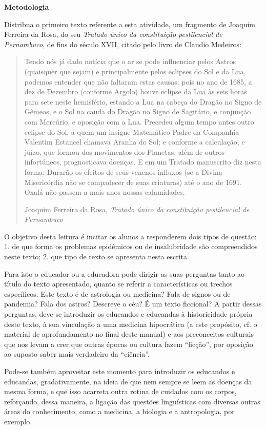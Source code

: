 \documentclass[12pt]{extarticle}
\begin{document}
\textbf{Metodologia}

Distribua o primeiro texto referente a esta atividade, um fragmento de
Joaquim Ferreira da Rosa, do seu \emph{Tratado único da constituição
pestilencial de Pernambuco}, de fins do século XVII, citado pelo livro
de Claudio Medeiros:

\begin{quote}
Tendo nós já dado notícia que o ar se pode influenciar pelos Astros
(quaisquer que sejam) e principalmente pelos eclipses do Sol e da Lua,
podemos entender que não faltaram estas causas: pois no ano de 1685, a
dez de Dezembro (conforme Argolo) houve eclipse da Lua às seis horas
para sete neste hemisfério, estando a Lua na cabeça do Dragão no Signo
de Gêmeos, e o Sol na cauda do Dragão no Signo de Sagitário, e conjunção
com Mercúrio, e oposição com a Lua. Precedeu algum tempo antes outro
eclipse do Sol, a quem um insigne Matemático Padre da Companhia Valentim
Estancel chamava Aranha do Sol; e conforme a calculação, e juízo, que
formou dos movimentos dos Planetas, além de outros infortúneos,
prognosticava doenças. E em um Tratado manuscrito diz nesta forma:
Durarão os efeitos de seus venenos influxos (se a Divina Misericórdia
não se compadecer de suas criaturas) até o ano de 1691. Oxalá não passem
a mais anos nossas calamidades.

Joaquim Ferreira da Rosa, \emph{Tratado único da constituição
pestilencial de Pernambuco}
\end{quote}

O objetivo desta leitura é incitar os alunos a responderem dois tipos de
questão: 1. de que forma os problemas epidêmicos ou de insalubridade são
compreendidos neste texto; 2. que tipo de texto se apresenta nesta
escrita.

Para isto o educador ou a educadora pode dirigir as suas perguntas tanto
ao título do texto apresentado, quanto se referir a características ou
trechos específicos. Este texto é de astrologia ou medicina? Fala de
signos ou de pandemia? Fala dos astros? Descreve o céu? É um texto
ficcional? A partir dessas perguntas, deve-se introduzir os educandos e
educandas à historicidade própria deste texto, à sua vinculação a uma
medicina hipocrática (a este propósito, cf. o material de aprofundamento
no final deste manual) e aos preconceitos culturais que nos levam a crer
que outras épocas ou cultura fazem ``ficção'', por oposição ao suposto
saber mais verdadeiro da ``ciência''.

Pode-se também aproveitar este momento para introduzir os educandos e
educandas, gradativamente, na ideia de que nem sempre se leem as doenças
da mesma forma, e que isso acarreta outra rotina de cuidados com os
corpos, reforçando, dessa maneira, a ligação das questões linguísticas
com diversas outras áreas do conhecimento, como a medicina, a biologia e
a antropologia, por exemplo.
\end{document}
